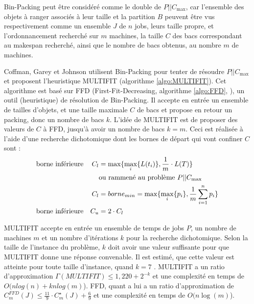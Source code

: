 \documentclass[a4paper,12pt]{report}
\theoremstyle{plain}				%
\theoremstyle{definition}				%
\newcommand\problemGrahamP{$P||C_{\max}$\xspace}
\begin{document}
Bin-Packing peut être considéré comme le double de \problemGrahamP, 
  car l'ensemble des objets à ranger associés à leur taille et la partition $B$ 
  peuvent être vus respectivement comme 
  un ensemble $J$ de $n$ jobs, leurs taille propre, 
  et l'ordonnancement recherché sur $m$ machines,
  la taille $C$ des bacs correspondant au makespan recherché, 
  ainsi que le nombre de bacs obtenus, au nombre $m$ de machines.
  
\bigskip
Coffman, Garey et Johnson \cite{coffman1978application} utilisent Bin-Packing 
  pour tenter de résoudre \problemGrahamP et proposent 
  l'heuristique MULTIFIT (algorithme \ref{algo:MULTIFIT}). 
Cet algorithme est basé sur FFD 
  (First-Fit-Decreasing, algorithme \ref{algo:FFD}, \cite{rieck2021basic}), 
  un outil (heuristique) de résolution de Bin-Packing. 
Il accepte en entrée un ensemble de tailles d'objets, et une taille maximale $C$ de bacs 
  et propose en retour un packing, donc un nombre de bacs $k$.
L'idée de MULTIFIT est de proposer des valeurs de $C$ à FFD, jusqu'à avoir un nombre de bacs $k=m$.
Ceci est réalisée à l'aide d'une recherche dichotomique dont les bornes de départ qui vont confiner $C$ sont : 
\begin{align*}
&\textnormal{borne inférieure} 	&C_l 	&= \max \{ \max_i \{ L(t_i) \}, \frac{1}{m} \cdot L(T) \} \\
& 								& 		& \textnormal{ou rammené au problème \problemGrahamP} \\	 
& 								& C_l 	&= borne_{min} = \max \{ \max_i\{p_i\}, \frac{1}{m} \sum_{i=1}^{n} p_i \} \\
&\textnormal{borne inférieure} 	&C_u 	&= 2 \cdot C_l 
\end{align*}

MULTIFIT accepte en entrée un ensemble de temps de jobs $P$, 
  un nombre de machines $m$ et 
  un nombre d'itérations $k$ pour la recherche dichotomique.
Selon la taille de l'instance du problème, $k$ doit avoir une valeur suffisante pour que 
  MULTIFIT donne une réponse convenable. 
Il est estimé, que cette valeur est atteinte pour toute taille d'instance, 
  quand $k=7$ \cite{coffman1978application}.
MULTIFIT a 
  un ratio d'approximation $\Gamma(MULTIFIT) \leq 1,220 + 2^{-k}$ et 
  une complexité en temps de $ O(n log(n) + kn log(m)$).
FFD, quant a lui a 
  un ratio d'approximation de $C_m^{FFD}(J) \leq \frac{11}{9} \cdot C_m^\star(J) + \frac{6}{9}$ 
  \cite{dosa2007tight} et une complexité en temps de $ O(n \log(m)$).
\end{document}
